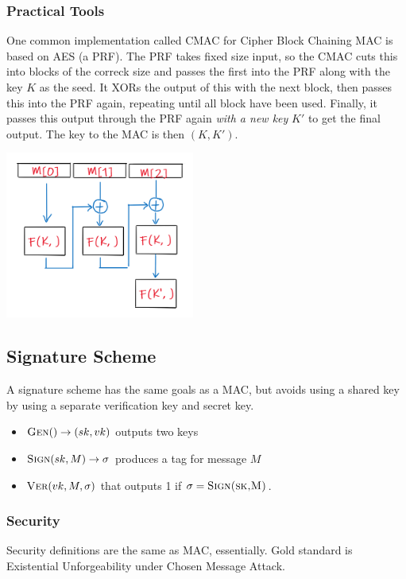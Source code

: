 \documentclass{article}
\begin{document}
\begin{multicols*}{2}
	\subsubsection{Practical Tools}
	One common implementation called CMAC for Cipher Block Chaining MAC is based on AES (a PRF). The PRF takes fixed size input, so the CMAC cuts this into blocks of the correck size and passes the first into the PRF along with the key $K$ as the seed. It XORs the output of this with the next block, then passes this into the PRF again, repeating until all block have been used. Finally, it passes this output through the PRF again \textit{with a new key} $K'$ to get the final output. The key to the MAC is then $(K, K')$.

	\includegraphics{cmac_construction.png}

	
	\subsection{Signature Scheme}
	A signature scheme has the same goals as a MAC, but avoids using a shared key by using a separate verification key and secret key. 
	\begin{itemize}[noitemsep, topsep=0pt]
		\item $\textsc{Gen}() \rightarrow (sk, vk)$ outputs two keys
		\item $\textsc{Sign}(sk, M) \rightarrow \sigma$ produces a tag for message $M$
		\item $\textsc{Ver}(vk, M, \sigma)$ that outputs 1 if $\sigma = \textsc{Sign(sk,M)}$.
	\end{itemize}
	
	\subsubsection{Security}
	Security definitions are the same as MAC, essentially. Gold standard is Existential Unforgeability under Chosen Message Attack.


\end{multicols*}
\end{document}
